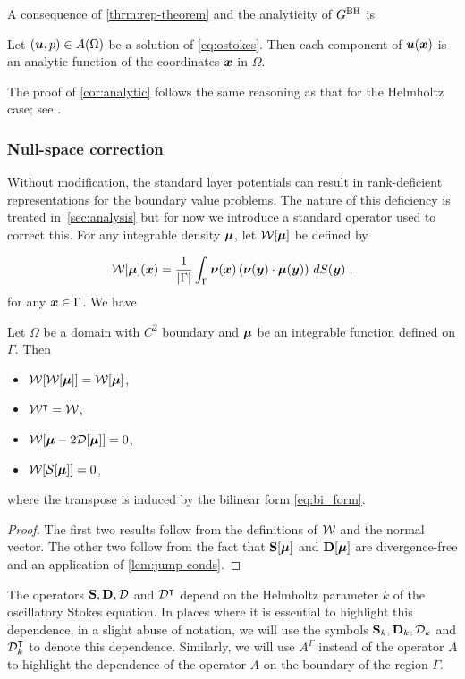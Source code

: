 A consequence of \cref{thrm:rep-theorem} and the analyticity
of $G^{\textrm{BH}}$ is 
\begin{cor}
\label{cor:analytic}  
  Let $({\boldsymbol u},p) \in A(\Omega)$ be a solution of \cref{eq:ostokes}.
  Then each component of ${\boldsymbol u}({\boldsymbol x})$ is an analytic function
  of the coordinates ${\boldsymbol x}$ in $\Omega$.
\end{cor}

The proof of \cref{cor:analytic} follows the same reasoning as
that for the Helmholtz case; see \cite[Theorem 3.5]{colton1983integral}.


\subsubsection{Null-space correction \label{subsubsec:nullspacecorr}}

Without modification, the standard layer potentials
can result in rank-deficient representations for
the boundary value problems. The nature of this deficiency
is treated in~\cref{sec:analysis} but for now we introduce a standard
operator used to correct this. For any integrable density
${\boldsymbol \mu}$, let ${\mathcal W}[{\boldsymbol \mu}]$ be defined by

\begin{equation} \label{eq:ones_operator}
  {\mathcal W}[{\boldsymbol \mu}]({\boldsymbol x}) = \frac{1}{|\Gamma|} \int_\Gamma {\boldsymbol \nu}({\boldsymbol x})
  \left ( {\boldsymbol \nu}({\boldsymbol y}) \cdot {\boldsymbol \mu}({\boldsymbol y}) \right )
  \, dS({\boldsymbol y}) \; ,
\end{equation}
for any ${\boldsymbol x} \in \Gamma$. We have

\begin{lem}
  \label{lem:propnullspacecorr}

  Let $\Omega$ be a domain with $C^2$ boundary and ${\boldsymbol \mu}$ be
  an integrable function defined on $\Gamma$. Then
  \begin{itemize}
  \item ${\mathcal W}[{\mathcal W}[{\boldsymbol \mu}]] = {\mathcal W}[{\boldsymbol \mu}]$,
  \item ${\mathcal W}^\intercal = {\mathcal W}$,
  \item ${\mathcal W}[{\boldsymbol \mu} - 2 {\mathcal D}[{\boldsymbol \mu}]] = 0$,
  \item ${\mathcal W}[{\mathcal S}[{\boldsymbol \mu}]] = 0$,
  \end{itemize}
  where the transpose is induced by the bilinear
  form \cref{eq:bi_form}.
\end{lem}

\begin{proof}
  The first two results follow from the definitions of ${\mathcal W}$ and
  the normal vector. The other two follow from the fact that
  ${\bf S}[{\boldsymbol \mu}]$ and ${\bf D}[{\boldsymbol \mu}]$ are divergence-free and
  an application of \cref{lem:jump-conds}.
\end{proof}

\begin{remark}
The operators ${\bf S},{\bf D},{\mathcal D}$ and ${\mathcal D}^{\intercal}$
depend on the Helmholtz parameter $k$ of the oscillatory Stokes equation.
In places where it is essential to highlight this dependence, in a slight
abuse of notation, we will use the symbols ${\bf S}_{k}, {\bf D}_{k},{\mathcal D}_{k}$ and ${\mathcal D}^{\intercal}_{k}$ to 
denote this dependence.
Similarly, we will use $A^{\Gamma}$ instead of the operator $A$ to highlight 
the dependence of the operator $A$ on the boundary of the region $\Gamma$.
\end{remark}

